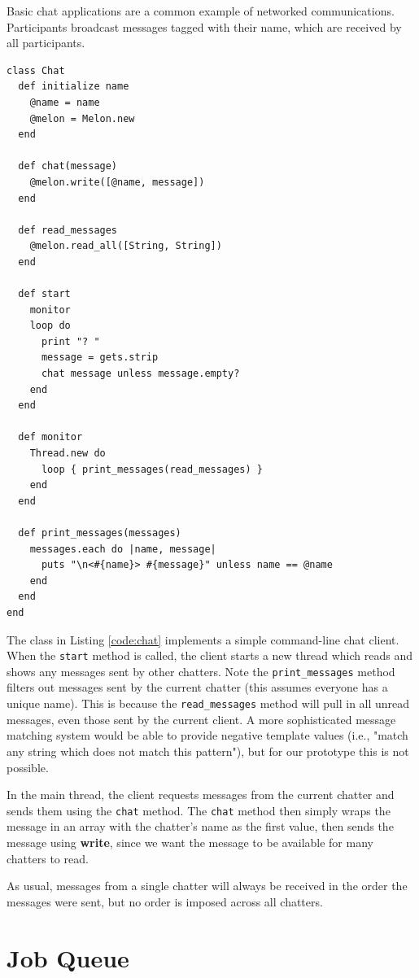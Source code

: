 Basic chat applications are a common example of networked communications. Participants broadcast messages tagged with their name, which are received by all participants.

\begin{lstlisting}[caption={Chat Application}, label={code:chat}]
class Chat
  def initialize name
    @name = name
    @melon = Melon.new
  end

  def chat(message)
    @melon.write([@name, message])
  end

  def read_messages
    @melon.read_all([String, String])
  end

  def start
    monitor
    loop do
      print "? "
      message = gets.strip
      chat message unless message.empty?
    end
  end

  def monitor
    Thread.new do
      loop { print_messages(read_messages) }
    end
  end
  
  def print_messages(messages)
    messages.each do |name, message|
      puts "\n<#{name}> #{message}" unless name == @name
    end
  end
end
\end{lstlisting}

The class in Listing \ref{code:chat} implements a simple command-line chat client. When the \texttt{start} method is called, the client starts a new thread which reads and shows any messages sent by other chatters. Note the \texttt{print\_messages} method filters out messages sent by the current chatter (this assumes everyone has a unique name). This is because the \texttt{read\_messages} method will pull in all unread messages, even those sent by the current client. A more sophisticated message matching system would be able to provide negative template values (i.e., "match any string which does not match this pattern"), but for our prototype this is not possible.

In the main thread, the client requests messages from the current chatter and sends them using the \texttt{chat} method. The \texttt{chat} method then simply wraps the message in an array with the chatter's name as the first value, then sends the message using \textbf{write}, since we want the message to be available for many chatters to read.

As usual, messages from a single chatter will always be received in the order the messages were sent, but no order is imposed across all chatters.

\section{Job Queue}

